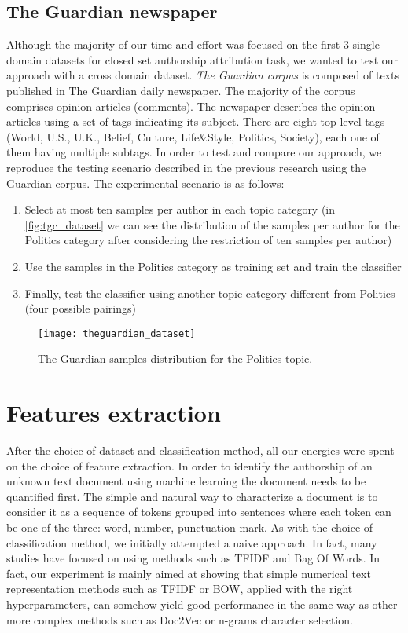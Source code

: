\subsection{The Guardian newspaper}
Although the majority of our time and effort was focused on the first 3 single domain datasets for closed set authorship attribution task, we wanted to test our approach with a cross domain dataset.
\textit{The Guardian corpus} is composed of texts published in The Guardian daily newspaper. The majority of the corpus comprises opinion articles
(comments). The newspaper describes the opinion articles using a set of tags indicating its subject. There are eight top-level tags (World, U.S., U.K., Belief, Culture, Life\&Style, Politics, Society), each one of them having multiple subtags.
In order to test and compare our approach, we reproduce the testing scenario
described in the previous research \cite{stamatatos2013robustness} using the Guardian corpus. The experimental
scenario is as follows: 
\begin{enumerate}
	\item Select at most ten samples per author in each topic category
	(in \autoref{fig:tgc_dataset} we can see the distribution of the samples per author for the Politics category after considering
	the restriction of ten samples per author)
	\item Use the samples in the Politics category as training set and train the classifier
	\item Finally, test the classifier using
	another topic category different from Politics (four possible pairings)
\end{enumerate}

\begin{figure}[ht]
	\centering
	\texttt{[image: theguardian\_dataset]}
	\caption[The Guardian Politics samples distribution]{The Guardian samples distribution for the Politics topic.}
	\label{fig:tgc_dataset}
\end{figure}

\section{Features extraction}
After the choice of dataset and classification method, all our energies were spent on the choice of feature extraction. In order to identify the authorship of an unknown text document using machine learning the document needs to be quantified first. The simple and natural way to characterize a document is to consider it as a sequence of tokens grouped into sentences where each token can be one of the three: word, number, punctuation mark.
As with the choice of classification method, we initially attempted a naive approach. In fact, many studies have focused on using methods such as TFIDF and Bag Of Words. In fact, our experiment is mainly aimed at showing that simple numerical text representation methods such as TFIDF or BOW, applied with the right hyperparameters, can somehow yield good performance in the same way as other more complex methods such as Doc2Vec or n-grams character selection.
